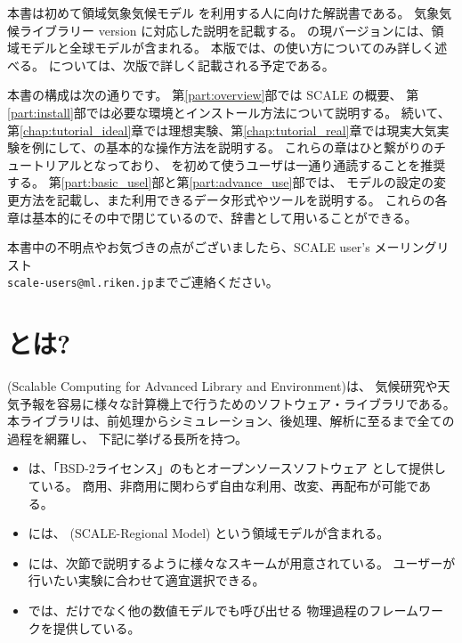 

本書は初めて領域気象気候モデル {\scalerm}
を利用する人に向けた解説書である。
気象気候ライブラリー{\scalelib}  version \version に対応した説明を記載する。
\scalelib の現バージョンには、領域モデル\scalerm と全球モデル\scalegm が含まれる。
本版では、\scalerm の使い方についてのみ詳しく述べる。
\scalegm については、次版で詳しく記載される予定である。

本書の構成は次の通りです。
第\ref{part:overview}部では SCALE の概要、
第\ref{part:install}部では必要な環境とインストール方法について説明する。
続いて、第\ref{chap:tutorial_ideal}章では理想実験、第\ref{chap:tutorial_real}章では現実大気実験を例にして、\scalerm の基本的な操作方法を説明する。
これらの章はひと繋がりのチュートリアルとなっており、
\scalerm を初めて使うユーザは一通り通読することを推奨する。
第\ref{part:basic_usel}部と第\ref{part:advance_use}部では、
モデルの設定の変更方法を記載し、また利用できるデータ形式やツールを説明する。
これらの各章は基本的にその中で閉じているので、辞書として用いることができる。

本書中の不明点やお気づきの点がございましたら、SCALE user's メーリングリスト\\
 \verb|scale-users@ml.riken.jp|までご連絡ください。



\section{\scalelib とは?} \label{subsec:scale_feature}

{\scalelib} (Scalable Computing for Advanced Library and Environment)は、
気候研究や天気予報を容易に様々な計算機上で行うためのソフトウェア・ライブラリである。
本ライブラリは、前処理からシミュレーション、後処理、解析に至るまで全ての過程を網羅し、
下記に挙げる長所を持つ。
\begin{itemize}
\item \scalelib は、「BSD-2ライセンス」のもとオープンソースソフトウェア
として提供している。
商用、非商用に関わらず自由な利用、改変、再配布が可能である。
\item \scalelib には、{\scalerm} (SCALE-Regional Model)
という領域モデルが含まれる。
\item \scalelib には、次節で説明するように様々なスキームが用意されている。
ユーザーが行いたい実験に合わせて適宜選択できる。
\item \scalelib では、\scalerm だけでなく他の数値モデルでも呼び出せる
物理過程のフレームワークを提供している。
\end{itemize}


